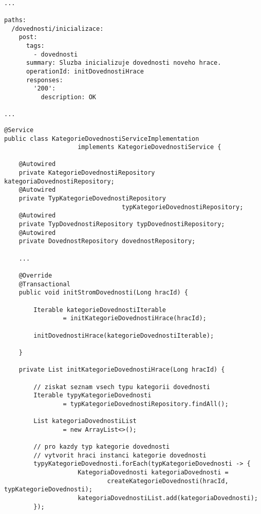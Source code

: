 \documentclass[twoside, 12pt]{article}
\begin{document}
{{


\begin{lstlisting}

...

paths:
  /dovednosti/inicializace:
    post:
      tags:
        - dovednosti
      summary: Sluzba inicializuje dovednosti noveho hrace.
      operationId: initDovednostiHrace
      responses:
        '200':
          description: OK

...

\end{lstlisting}

\vspace{50}


\begin{lstlisting}
@Service
public class KategorieDovednostiServiceImplementation
                    implements KategorieDovednostiService {

    @Autowired
    private KategorieDovednostiRepository kategoriaDovednostiRepository;
    @Autowired
    private TypKategorieDovednostiRepository
                                typKategorieDovednostiRepository;
    @Autowired
    private TypDovednostiRepository typDovednostiRepository;
    @Autowired
    private DovednostRepository dovednostRepository;

    ...

    @Override
    @Transactional
    public void initStromDovednosti(Long hracId) {

        Iterable kategorieDovednostiIterable
                = initKategorieDovednostiHrace(hracId);

        initDovednostiHrace(kategorieDovednostiIterable);

    }

    private List initKategorieDovednostiHrace(Long hracId) {

        // ziskat seznam vsech typu kategorii dovednosti
        Iterable typyKategorieDovednosti
                = typKategorieDovednostiRepository.findAll();

        List kategoriaDovednostiList
                = new ArrayList<>();

        // pro kazdy typ kategorie dovednosti
        // vytvorit hraci instanci kategorie dovednosti
        typyKategorieDovednosti.forEach(typKategorieDovednosti -> {
                    KategoriaDovednosti kategoriaDovednosti =
                            createKategorieDovednosti(hracId, typKategorieDovednosti);
                    kategoriaDovednostiList.add(kategoriaDovednosti);
        });


\end{lstlisting}}}
\end{document}
